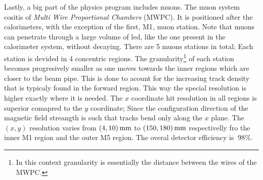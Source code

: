 Lastly, a big part of the \lhcb physics program includes muons. The muon system cositis of {\it Multi Wire Proportional Chambers}
(MWPC). It is positioned after the calorimeters, with the exception of the first, M1, muon station.
Note that muons can penetrate through a large volume of led, like the one present in the calorimeter system,
without decaying. There are 5 muons stations in total; Each station is devided in 4 concentric regions.
The granularity\footnote{In this context granularity is essentially the distance between the wires of the MWPC.}
of each station becomes progresively smaller as one moves towards the inner regions which are closer to the beam pipe.
This is done to acount for the increasing track density that is typicaly found in the forward region. This way
the special resolution is higher exactly where it is needed. The $x$ coordinate hit resolution in all regions
is superior comapred to the $y$ coordinate; Since the configuration direction of the \lhcb magnetic field streangth
is such that tracks bend only along the $x$ plane. The $(x,y)$ resolution varies from $(4,10)\rm \,mm$ to $(150,180)\rm \,mm$
respectivelly fro the inner M1 region and the outer M5 region. The overal detector efficiency is $\>98\%$.
